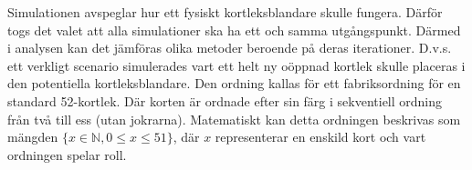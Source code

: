 \documentclass[swedish,a4paper]{article}
\begin{document}
Simulationen avspeglar hur ett fysiskt kortleksblandare skulle fungera. Därför
togs det valet att alla simulationer ska ha ett och samma utgångspunkt. Därmed i
analysen kan det jämföras olika metoder beroende på deras iterationer. D.v.s. ett verkligt
scenario simulerades vart ett helt ny oöppnad kortlek skulle placeras i den
potentiella kortleksblandare. Den ordning kallas för ett fabriksordning för
en standard 52-kortlek. Där korten är ordnade efter sin färg i sekventiell
ordning från två till ess (utan jokrarna). Matematiskt kan detta ordningen
beskrivas som mängden $\{x \in \mathbb{N},  0 \leq x \leq 51 \}$, där $x$
representerar en enskild kort och vart ordningen spelar roll. 
\end{document}
